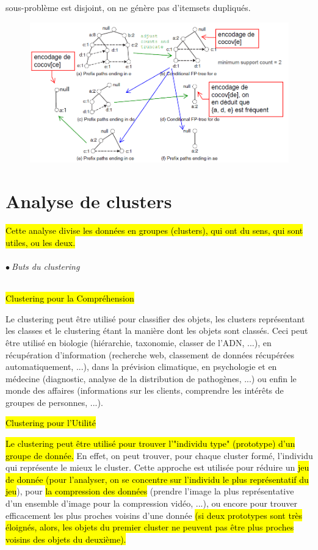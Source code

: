 \documentclass[letterpaper, 12pt]{article}
\newcommand{\alinea}{
\hspace*{0.5cm}}
\newcommand{\point}{$\bullet\ $}
\begin{document}
				sous-problème est disjoint, on ne génère pas d'itemsets
				dupliqués.
			\begin{figure}[H]
				\centering
				\includegraphics[scale=0.625]{Images/fptree_3}
				\caption{}
				\label{fig:fptree:3}
			\end{figure}\noindent
%
\part{Analyse de clusters}
	\alinea \hl{Cette analyse divise les données en groupes (clusters), qui
		ont du sens, qui sont utiles, ou les deux.}
	\paragraph{\point Buts du clustering}
		\subparagraph{\hl{Clustering pour la Compréhension}} Le clustering
			peut être utilisé pour classifier des objets, les clusters
			représentant les classes et le clustering étant la manière
			dont les objets sont classés. Ceci peut être utilisé en 
			biologie (hiérarchie, taxonomie, classer de l'ADN, ...), 
			en récupération d'information (recherche web, classement de
			données récupérées automatiquement, ...), dans la prévision
			climatique, en psychologie et en médecine (diagnostic, 
			analyse de la distribution de pathogènes, ...) ou enfin le 
			monde des affaires (informations sur les clients, comprendre
			les intérêts de groupes de personnes, ...).
		\subparagraph{\hl{Clustering pour l'Utilité}} 
			\hl{Le clustering peut être
			utilisé pour trouver l'"individu type" (prototype) 
			d'un groupe de donnée.}
			En effet, on peut trouver, pour chaque cluster formé, l'individu
			qui représente le mieux le cluster. Cette approche est utilisée
			pour réduire un \hl{jeu de donnée (pour l'analyser, on se concentre
			sur l'individu le plus représentatif du jeu}), pour \hl{la 
			compression des données} (prendre l'image la plus représentative
			d'un ensemble d'image pour la compression vidéo, ...), ou encore
			pour trouver efficacement les plus proches voisins d'une
			donnée \hl{(si deux prototypes sont très éloignés, alors, les
			objets du premier cluster ne peuvent pas être plus proches
			voisins des objets du deuxième).}
\end{document}
